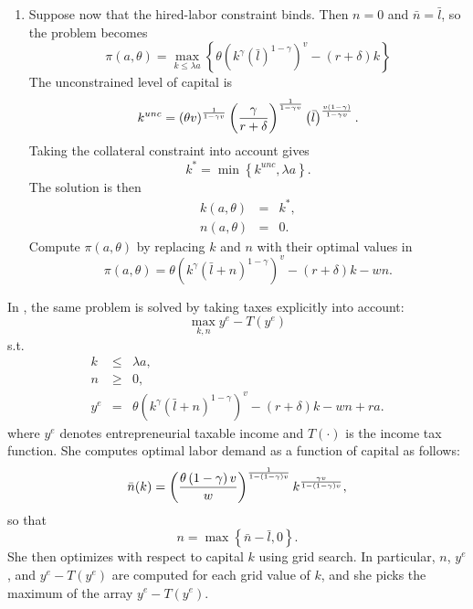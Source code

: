 \documentclass[11pt,fleqn]{article}
\begin{document}
\begin{enumerate}
	\item Suppose now that the hired-labor constraint binds. Then $n=0$ and $\bar{n}=\bar{l}$, so the problem becomes%
	\begin{equation*}
		\pi \left( a,\theta \right) =\max_{k\leq \lambda a}\left\{ \theta \left( k^{\gamma
		}\left(\bar{l}\right) ^{1-\gamma }\right) ^{v}-\left( r+\delta \right)
		k\right\}
	\end{equation*}%
	The unconstrained level of capital is%
	\begin{equation*}
		k^{unc}=\left( \theta v\right) ^{\frac{1}{1-\gamma v}}\left( \frac{\gamma }{%
			r+\delta }\right) ^{\frac{1}{1-\gamma v}}\left(\bar{l}\right) ^{\frac{v\left(
				1-\gamma \right) }{1-\gamma v}}.
	\end{equation*}%
	Taking the collateral constraint into account gives%
	\begin{equation*}
		k^{\ast }=\min \left\{ k^{unc},\lambda a\right\} .
	\end{equation*}%
	The solution is then%
	\begin{eqnarray*}
		k\left( a,\theta \right) &=&k^{\ast }, \\
		n\left( a,\theta \right) &=&0.
	\end{eqnarray*}%
	Compute $\pi \left( a,\theta \right)$ by replacing $k$ and $n$ with their optimal values in 
	\begin{equation*}
		\pi \left( a,\theta \right) =\theta \left( k^{\gamma }\left( \bar{l}+n\right)
		^{1-\gamma }\right) ^{v}-\left( r+\delta \right) k-wn.
	\end{equation*}
\end{enumerate}

In \citet{Bruggemann2021}, the same problem is solved by taking taxes explicitly into
account:%
\begin{equation*}
	\max_{k,n}y^{e}-T(y^{e})
\end{equation*}%
s.t.%
\begin{eqnarray*}
	k &\leq &\lambda a, \\
	n &\geq &0, \\
	y^{e} &=& \theta \left( k^{\gamma }\left( \bar{l}+n\right) ^{1-\gamma }\right)
	^{v}-\left( r+\delta \right) k-wn+ra.
\end{eqnarray*}%
where $y^{e}$ denotes entrepreneurial taxable income and $T(\cdot )$ is
the income tax function. She computes optimal labor demand as a function of capital as follows:%
\begin{equation*}
	\bar{n}(k)=\left( \frac{\theta \left( 1-\gamma \right) v}{w}\right) ^{%
		\frac{1}{1-\left( 1-\gamma \right) v}}k^{\frac{\gamma v}{1-\left( 1-\gamma
			\right) v}},
\end{equation*}%
so that%
\begin{equation*}
	n=\max \left\{ \bar{n}-\bar{l},0\right\} .
\end{equation*}%
She then optimizes with respect to capital $k$ using grid search. In particular, $n$, $y^{e}$, and $y^{e}-T(y^{e})$ are computed for each grid value of $k$, and she picks the maximum of the array $y^{e}-T(y^{e})$.
\end{document}
